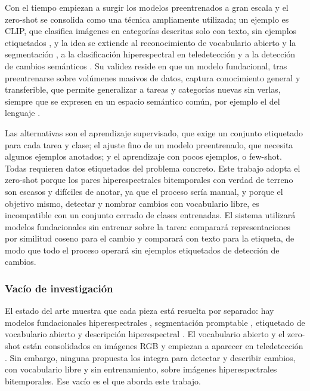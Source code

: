 \documentclass[12pt,onecolumn]{IEEEtran}
\begin{document}
Con el tiempo empiezan a surgir los modelos preentrenados a gran escala y el zero-shot se consolida como una técnica ampliamente utilizada; un ejemplo es CLIP, que clasifica imágenes en categorías descritas solo con texto, sin ejemplos etiquetados \cite{radford2021clip}, y la idea se extiende al reconocimiento de vocabulario abierto y la segmentación \cite{kombol2025trainingfree}, a la clasificación hiperespectral en teledetección \cite{pang2025special} y a la detección de cambios semánticos \cite{zhu2025semanticcd}. Su validez reside en que un modelo fundacional, tras preentrenarse sobre volúmenes masivos de datos, captura conocimiento general y transferible, que permite generalizar a tareas y categorías nuevas sin verlas, siempre que se expresen en un espacio semántico común, por ejemplo el del lenguaje \cite{wang2024hypersigma,radford2021clip}.

Las alternativas son el aprendizaje supervisado, que exige un conjunto etiquetado para cada tarea y clase; el ajuste fino de un modelo preentrenado, que necesita algunos ejemplos anotados; y el aprendizaje con pocos ejemplos, o few-shot. Todas requieren datos etiquetados del problema concreto. Este trabajo adopta el zero-shot porque los pares hiperespectrales bitemporales con verdad de terreno son escasos y difíciles de anotar, ya que el proceso sería manual, y porque el objetivo mismo, detectar y nombrar cambios con vocabulario libre, es incompatible con un conjunto cerrado de clases entrenadas. El sistema utilizará modelos fundacionales sin entrenar sobre la tarea: comparará representaciones por similitud coseno para el cambio y comparará con texto para la etiqueta, de modo que todo el proceso operará sin ejemplos etiquetados de detección de cambios.

\subsubsection{Vacío de investigación}
El estado del arte muestra que cada pieza está resuelta por separado: hay modelos fundacionales hiperespectrales \cite{wang2024hypersigma}, segmentación promptable \cite{kirillov2023sam}, etiquetado de vocabulario abierto \cite{radford2021clip} y descripción hiperespectral \cite{das2025hypercap}. El vocabulario abierto y el zero-shot están consolidados en imágenes RGB y empiezan a aparecer en teledetección \cite{zhu2025semanticcd,kombol2025trainingfree}. Sin embargo, ninguna propuesta los integra para detectar y describir cambios, con vocabulario libre y sin entrenamiento, sobre imágenes hiperespectrales bitemporales. Ese vacío es el que aborda este trabajo.
\end{document}

